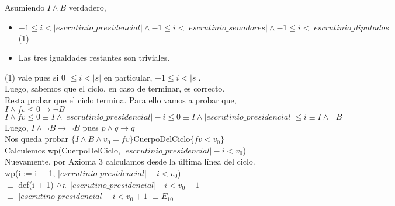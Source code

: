 \documentclass[10pt,a4paper]{article}
\begin{document}
\noindent Asumiendo $I \land B$ verdadero,

\begin{itemize}\setlength{\itemindent}{0.5cm}
	\item $-1 \leq i < |escrutinio\_presidencial| \land -1 \leq i < |escrutinio\_senadores| \land -1 \leq i < |escrutinio\_diputados|$ (1)
	\item Las tres igualdades restantes son triviales.
\end{itemize}

\noindent (1) vale pues si 0 $\leq i < |s| $ en particular, $-1 \leq i < |s|$. \\

\noindent Luego, sabemos que el ciclo, en caso de terminar, es correcto. \\

\noindent Resta probar que el ciclo termina. Para ello vamos a probar que, \\

\noindent $I \land fv \leq 0 \rightarrow \neg B$ \\

\noindent $I \land fv \leq 0 \equiv I \land |escrutinio\_presidencial| - i \leq 0 \equiv I \land |escrutinio\_presidencial| \leq i \equiv I \land \neg B$ \\

\noindent Luego, $I \land \neg B \rightarrow \neg B$ pues $p \land q \rightarrow q$ \\

\noindent Nos queda probar $\{I \land B \land v_0 = fv\}$CuerpoDelCiclo$\{fv < v_0\}$ \\

\noindent Calculemos wp(CuerpoDelCiclo, $|escrutinio\_presidencial| - i < v_0$) \\

\noindent Nuevamente, por Axioma 3 calculamos desde la última línea del ciclo. \vspace{0.1cm} \\

\noindent wp(i := i + 1, $|escrutinio\_presidencial| - i < v_0$) \\

\noindent $\equiv$ def(i + 1) $\land _L$ $|escrutino\_presidencial|$  - $i < v_0 + 1$\\

\noindent $\equiv$ $|escrutino\_presidencial|$  - $i < v_0 + 1$ $\equiv E_{10}$ \vspace{0.3cm} \\
\end{document}
